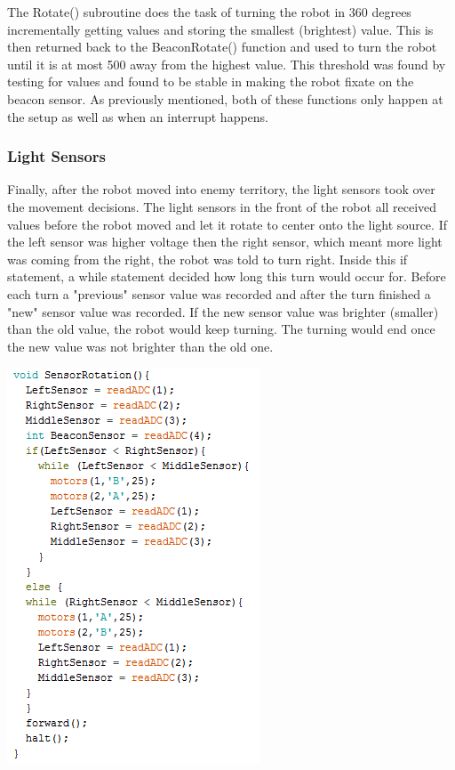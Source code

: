 \documentclass{article}
\begin{document}
    The Rotate() subroutine does the task of turning the robot in 360 degrees incrementally getting values and storing the smallest (brightest) value. This is then returned back to the BeaconRotate() function and used to turn the robot until it is at most 500 away from the highest value. This threshold was found by testing for values and found to be stable in making the robot fixate on the beacon sensor. As previously mentioned, both of these functions only happen at the setup as well as when an interrupt happens.  
    
    \subsubsection{Light Sensors}
    Finally, after the robot moved into enemy territory, the light sensors took over the movement decisions. The light sensors in the front of the robot all received values before the robot moved and let it rotate to center onto the light source. If the left sensor was higher voltage then the right sensor, which meant more light was coming from the right, the robot was told to turn right. Inside this if statement, a while statement decided how long this turn would occur for. Before each turn a "previous" sensor value was recorded and after the turn finished a "new" sensor value was recorded. If the new sensor value was brighter (smaller) than the old value, the robot would keep turning. The turning would end once the new value was not brighter than the old one. \\
    
    \begin{center}
    \includegraphics[]{SensorRotate.png}
    \end{center}
    
\end{document}
